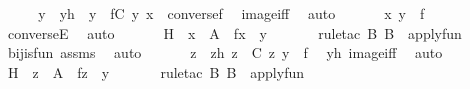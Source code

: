 \begin{isabellebody}
\ \ \isamarkupfalse%
\ \isamarkupfalse%
\ y\ \ yh\ {\isacharcolon}{\kern0pt}\ {\isachardoublequoteopen}y\ {\isasymin}\ f{\isacharbackquote}{\kern0pt}{\isacharbackquote}{\kern0pt}C{\isachardoublequoteclose}\ {\isachardoublequoteopen}{\isacharless}{\kern0pt}y{\isacharcomma}{\kern0pt}\ x{\isachargreater}{\kern0pt}\ {\isasymin}\ converse{\isacharparenleft}{\kern0pt}f{\isacharparenright}{\kern0pt}{\isachardoublequoteclose}\ \isamarkupfalse%
\ image{\isacharunderscore}{\kern0pt}iff\ \isamarkupfalse%
\ auto\ \isanewline
\ \ \isamarkupfalse%
\ \isamarkupfalse%
\ {\isachardoublequoteopen}{\isacharless}{\kern0pt}x{\isacharcomma}{\kern0pt}\ y{\isachargreater}{\kern0pt}\ {\isasymin}\ f{\isachardoublequoteclose}\ \isamarkupfalse%
\ converseE\ \isamarkupfalse%
\ auto\ \isanewline
\ \ \isamarkupfalse%
\ \isamarkupfalse%
\ H\ {\isacharcolon}{\kern0pt}\ {\isachardoublequoteopen}x\ {\isasymin}\ A\ {\isasymand}\ f{\isacharbackquote}{\kern0pt}x\ {\isacharequal}{\kern0pt}\ y{\isachardoublequoteclose}\ \isanewline
\ \ \ \ \isamarkupfalse%
\ {\isacharparenleft}{\kern0pt}rule{\isacharunderscore}{\kern0pt}tac\ B{\isacharequal}{\kern0pt}{\isachardoublequoteopen}{\isacharparenleft}{\kern0pt}{\isasymlambda}{\isacharunderscore}{\kern0pt}{\isachardot}{\kern0pt}\ B{\isacharparenright}{\kern0pt}{\isachardoublequoteclose}\ \ apply{\isacharunderscore}{\kern0pt}fun{\isacharparenright}{\kern0pt}\ \isanewline
\ \ \ \ \isamarkupfalse%
\ bij{\isacharunderscore}{\kern0pt}is{\isacharunderscore}{\kern0pt}fun\ assms\ \isamarkupfalse%
\ auto\ \isanewline
\ \ \isamarkupfalse%
\ \isamarkupfalse%
\ z\ \ zh{\isacharcolon}{\kern0pt}\ {\isachardoublequoteopen}z\ {\isasymin}\ C{\isachardoublequoteclose}\ {\isachardoublequoteopen}{\isacharless}{\kern0pt}z{\isacharcomma}{\kern0pt}\ y{\isachargreater}{\kern0pt}\ {\isasymin}\ f{\isachardoublequoteclose}\ \isamarkupfalse%
\ yh\ image{\isacharunderscore}{\kern0pt}iff\ \isamarkupfalse%
\ auto\ \isanewline
\ \ \isamarkupfalse%
\ \isamarkupfalse%
\ H{}\ {\isacharcolon}{\kern0pt}\ {\isachardoublequoteopen}z\ {\isasymin}\ A\ {\isasymand}\ f{\isacharbackquote}{\kern0pt}z\ {\isacharequal}{\kern0pt}\ y{\isachardoublequoteclose}\ \isanewline
\ \ \ \ \isamarkupfalse%
\ {\isacharparenleft}{\kern0pt}rule{\isacharunderscore}{\kern0pt}tac\ B{\isacharequal}{\kern0pt}{\isachardoublequoteopen}{\isacharparenleft}{\kern0pt}{\isasymlambda}{\isacharunderscore}{\kern0pt}{\isachardot}{\kern0pt}\ B{\isacharparenright}{\kern0pt}{\isachardoublequoteclose}\ \ apply{\isacharunderscore}{\kern0pt}fun{\isacharparenright}{\kern0pt}\ \isanewline

\end{isabellebody}
